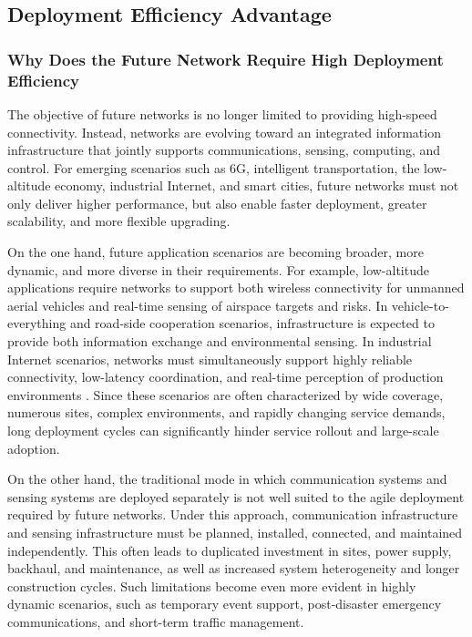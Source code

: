 \subsection{Deployment Efficiency Advantage}
\label{subsec:ch1-isac-core value-deployment}
\subsubsection{Why Does the Future Network Require High Deployment Efficiency}
\label{subsubsec:ch1-isac-core value-deployment-why}

The objective of future networks is no longer limited to providing high-speed connectivity. Instead, networks are evolving toward an integrated information infrastructure that jointly supports communications, sensing, computing, and control. For emerging scenarios such as 6G, intelligent transportation, the low-altitude economy, industrial Internet, and smart cities, future networks must not only deliver higher performance, but also enable faster deployment, greater scalability, and more flexible upgrading.

On the one hand, future application scenarios are becoming broader, more dynamic, and more diverse in their requirements. For example, low-altitude applications require networks to support both wireless connectivity for unmanned aerial vehicles and real-time sensing of airspace targets and risks. In vehicle-to-everything and road-side cooperation scenarios, infrastructure is expected to provide both information exchange and environmental sensing. In industrial Internet scenarios, networks must simultaneously support highly reliable connectivity, low-latency coordination, and real-time perception of production environments \cite{Zhang2021ISAC6G, Feng2020JointRadarCommunication, Shafi20175G}. Since these scenarios are often characterized by wide coverage, numerous sites, complex environments, and rapidly changing service demands, long deployment cycles can significantly hinder service rollout and large-scale adoption.

On the other hand, the traditional mode in which communication systems and sensing systems are deployed separately is not well suited to the agile deployment required by future networks. Under this approach, communication infrastructure and sensing infrastructure must be planned, installed, connected, and maintained independently. This often leads to duplicated investment in sites, power supply, backhaul, and maintenance, as well as increased system heterogeneity and longer construction cycles. Such limitations become even more evident in highly dynamic scenarios, such as temporary event support, post-disaster emergency communications, and short-term traffic management.


